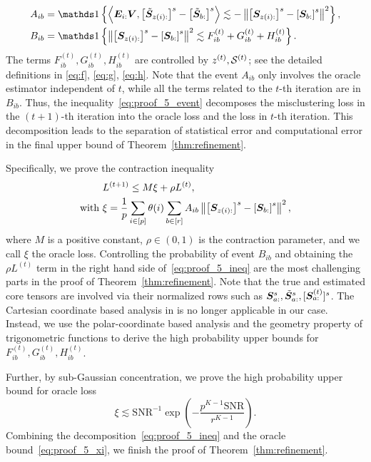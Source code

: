 \documentclass[journal]{IEEEtran}
\theoremstyle{definition}
\theoremstyle{definition}
\newcommand{\of}[1]{\left(#1\right)}
\newcommand{\off}[1]{\left[#1\right]}
\newcommand{\offf}[1]{\left\{#1\right\}}
\newcommand{\ang}[1]{\left\langle#1\right\rangle}
\begin{document}
\vspace{-0.5cm}
\small
\begin{align}
        A_{ib} &= \ind \offf{\ang{ \mE_{i:} \mV, \off{  \tilde \mS_{z(i):} }^s - \off{  \tilde \mS_{b:} }^s } \lesssim -  \onorm{ \off{ \mS_{z(i):}  }^s - \off{ \mS_{b:}  }^s  }^2 },\\
        B_{ib} &= \ind \offf{\onorm{ \off{ \mS_{z(i):}  }^s - \off{ \mS_{b:}  }^s  }^2 \lesssim F_{ib}^{(t)} + G_{ib}^{(t)} + H_{ib}^{(t)} }.
\end{align}
\normalsize
The terms $F_{ib}^{(t)}, G_{ib}^{(t)}, H_{ib}^{(t)}$ are controlled by $z^{(t)}, \mathcal{S}^{(t)}$; see the detailed definitions in \eqref{eq:f}, \eqref{eq:g}, \eqref{eq:h}. Note that the event $A_{ib}$ only involves the oracle estimator independent of $t$, while all the terms related to the $t$-th iteration are in $B_{ib}$. Thus, the inequality~\eqref{eq:proof_5_event} decomposes the misclustering loss in the $(t+1)$-th iteration into the oracle loss and the loss in $t$-th iteration. This decomposition leads to the separation of statistical error and computational error in the final upper bound of Theorem~\ref{thm:refinement}.

Specifically, we prove the contraction inequality
\begin{align}
     &L^{(t+1)} \leq M \xi + \rho L^{(t)}, \\
     \text{with }&\xi = \frac{1}{p}  \sum_{i \in [p]} \theta(i) \sum_{b \in [r]}  A_{ib} \onorm{ \off{ \mS_{ z(i):}  }^s - \off{ \mS_{b:}  }^s  }^2, \label{eq:proof_5_ineq}
\end{align}
where $M$ is a positive constant, $\rho \in (0,1)$ is the contraction parameter, and we call $\xi$ the oracle loss. Controlling the probability of event $B_{ib}$ and obtaining the $\rho L^{(t)}$ term in the right hand side of~\eqref{eq:proof_5_ineq} are the most challenging parts in the proof of Theorem~\ref{thm:refinement}. Note that the true and estimated core tensors are involved via their normalized rows such as $\bm S_{a:}^s, \tilde {\bm S}_{a:}^s, [\bm S^{(t)}_{a:}]^s$. The Cartesian coordinate based analysis in \cite{han2020exact} is no longer applicable in our case. Instead, we use the polar-coordinate based analysis and the geometry property of trigonometric functions to derive the high probability upper bounds for $F_{ib}^{(t)}, G_{ib}^{(t)}, H_{ib}^{(t)}$. 

Further, by sub-Gaussian concentration, we prove the high probability upper bound for oracle loss
\begin{equation}\label{eq:proof_5_xi}
    \xi  \lesssim {\text{SNR}^{-1}}\exp\of{- \frac{p^{K-1}\text{SNR}}{r^{K-1}}}.
\end{equation}
Combining the decomposition~\eqref{eq:proof_5_ineq} and the oracle bound~\eqref{eq:proof_5_xi}, we finish the proof of Theorem~\ref{thm:refinement}.
\end{document}
